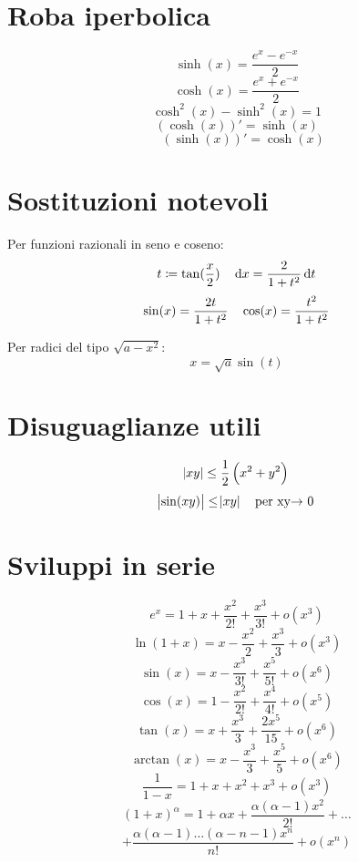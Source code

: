 \documentclass[a4paper,portrait,columns=3,5pt]{cheatsheet}
\begin{document}
\section{Roba iperbolica}
$$ \sinh(x) = \frac{e^x - e^{-x}}{2} $$
$$\cosh(x) = \frac{e^x + e^{-x}}{2}$$
$$ \cosh^2(x) - \sinh^2(x) = 1 $$
$$ (\cosh(x))' = \sinh(x)$$
$$ \quad (\sinh(x))' = \cosh(x) $$
\section{Sostituzioni notevoli}
Per funzioni razionali in seno e coseno: 
$$t \coloneqq \tan(\frac{x}{2})\quad \dif x = \frac{2}{1 + t^2} \dif t$$
$$ \sin(x) = \frac{2t}{1+t^2} \quad \cos(x) = \frac{\-t^2}{1+t^2}$$

Per radici del tipo $\sqrt{a - x^2}$:
$$ x = \sqrt{a} \sin(t) $$

\section{Disuguaglianze utili}
$$ \abs{xy} \leq \frac{1}{2}\left(x^2 + y^2\right) $$
$$ \abs{\sin(xy)} \leq \abs{xy}\quad \text{per xy$\rightarrow$ 0}$$
\section{Sviluppi in serie}
$$ e^x = 1 + x + \frac{x^2}{2!} + \frac{x^3}{3!} + o(x^3)$$
$$ \ln(1 + x) = x - \frac{x^2}{2} + \frac{x^3}{3} + o(x^3)$$
$$ \sin(x) = x - \frac{x^3}{3!} + \frac{x^5}{5!} + o(x^6)$$
$$ \cos(x) = 1 - \frac{x^2}{2!} + \frac{x^4}{4!} + o(x^5)$$
$$ \tan(x) = x + \frac{x^3}{3} + \frac{2x^5}{15} + o(x^6)$$
$$ \arctan(x) = x - \frac{x^3}{3} + \frac{x^5}{5} + o(x^6)$$
$$ \frac{1}{1-x} = 1 + x + x^2 + x^3 + o(x^3)$$
$$(1 + x) ^ \alpha = 1 + \alpha x + \frac{\alpha (\alpha - 1)x^2}{2!} + \dots $$
$$ + \frac{\alpha(\alpha - 1)\dots (\alpha - n - 1) x^n}{n!} + o(x^n) $$
\end{document}
